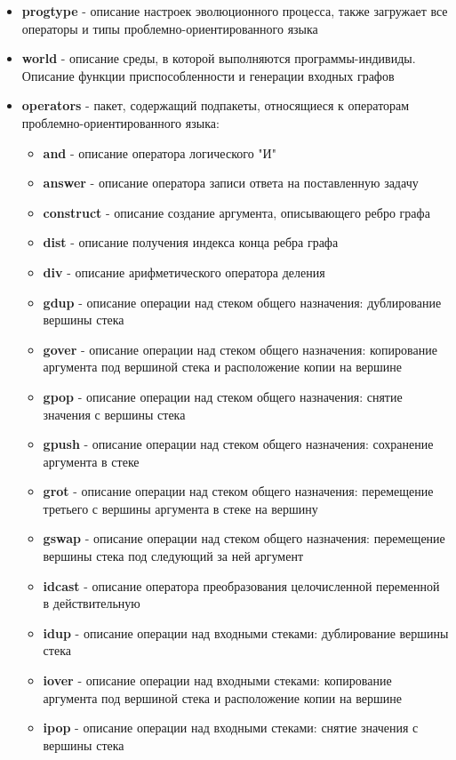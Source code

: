 \documentclass[russian,utf8,emptystyle]{eskdtext}
\begin{document}
\begin{itemize}
\begin{itemize}
\item \textbf{progtype} - описание настроек эволюционного процесса, также загружает все операторы и типы проблемно-ориентированного языка
\item \textbf{world} - описание среды, в которой выполняются программы-индивиды. Описание функции приспособленности и генерации входных графов
\item \textbf{operators} - пакет, содержащий подпакеты, относящиеся к операторам проблемно-ориентированного языка:
\begin{itemize}
\item \textbf{and} - описание оператора логического "И"
\item \textbf{answer} - описание оператора записи ответа на поставленную задачу
\item \textbf{construct} - описание создание аргумента, описывающего ребро графа
\item \textbf{dist} - описание получения индекса конца ребра графа
\item \textbf{div} - описание арифметического оператора деления
\item \textbf{gdup} - описание операции над стеком общего назначения: дублирование вершины стека
\item \textbf{gover} - описание операции над стеком общего назначения: копирование аргумента под вершиной стека и расположение копии на вершине
\item \textbf{gpop} - описание операции над стеком общего назначения: снятие значения с вершины стека
\item \textbf{gpush} - описание операции над стеком общего назначения: сохранение аргумента в стеке
\item \textbf{grot} -  описание операции над стеком общего назначения: перемещение третьего с вершины аргумента в стеке на вершину
\item \textbf{gswap} - описание операции над стеком общего назначения: перемещение вершины стека под следующий за ней аргумент
\item \textbf{idcast} -  описание оператора преобразования целочисленной переменной в действительную
\item \textbf{idup} - описание операции над входными стеками: дублирование вершины стека
\item \textbf{iover} - описание операции над входными стеками: копирование аргумента под вершиной стека и расположение копии на вершине
\item \textbf{ipop} - описание операции над входными стеками: снятие значения с вершины стека

\end{itemize}
\end{itemize}
\end{itemize}
\end{document}

